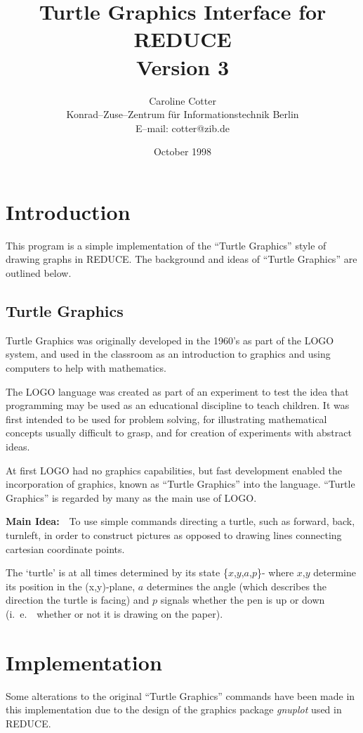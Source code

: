 \documentclass[11pt]{article}
\title{{\bf Turtle Graphics Interface for REDUCE \\
            Version 3}}
\author{Caroline Cotter \\ Konrad--Zuse--Zentrum f\"ur Informationstechnik
        Berlin \\ E--mail: cotter@zib.de}
\date{October 1998}
\begin{document}
\maketitle


\section{Introduction}
 This program is a simple implementation of the ``Turtle Graphics''
style of drawing graphs in {\small REDUCE}. The background and ideas of
``Turtle Graphics'' are outlined below.

\subsection{Turtle Graphics}

 Turtle Graphics was originally developed in the 1960's as part of the
LOGO system, and used in the classroom as an introduction to graphics
and using computers to help with mathematics.

The LOGO language was created as part of an experiment to test the idea
that programming may be used as an educational discipline to teach children.
It was first intended to be used for problem solving, for illustrating
mathematical concepts usually difficult to grasp, and for creation of
experiments with abstract ideas.

At first LOGO had no graphics capabilities, but fast development enabled
the incorporation of graphics, known as ``Turtle Graphics'' into the
language. ``Turtle Graphics'' is regarded by many as the main use of
LOGO.


{\bf Main Idea:}\ \ To use simple commands directing a turtle, such as
forward, back, turnleft, in order to construct pictures as opposed to
drawing lines connecting cartesian coordinate points.

The `turtle' is at all times determined by its state \{$x$,$y$,$a$,$p$\}-
where $x$,$y$ determine its position in the {\mbox (x,y)-plane}, $a$
determines the angle (which describes the direction the turtle is
facing) and $p$ signals whether the pen is up or down (i.\ e.\ \  whether or
not it is drawing on the paper).


\section{Implementation}
Some alterations to the original ``Turtle Graphics'' commands have been
made in this implementation due to the design of the graphics package
{\em gnuplot} used in {\small REDUCE}.
\end{document}
